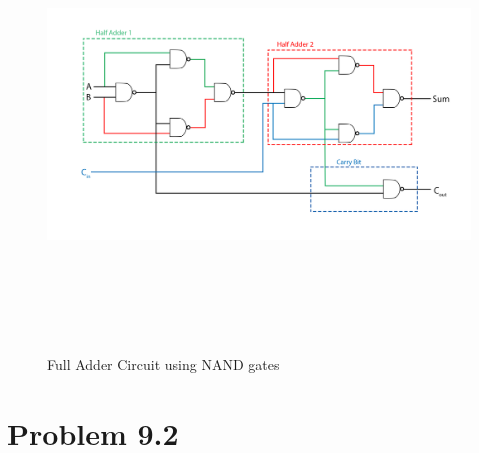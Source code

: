 \documentclass{article}
\begin{document}
    \begin{figure}
    	\includegraphics[height=12cm, angle=270]{fulladder2.png}
    	\caption{Full Adder Circuit using NAND gates}
    \end{figure}
	\pagebreak
	
	\section{\textbf{Problem 9.2}}
\end{document}
